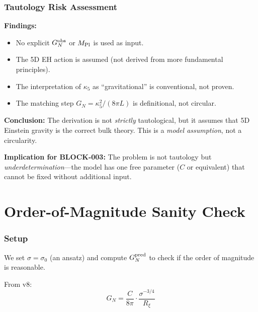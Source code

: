 \documentclass[11pt,a4paper]{article}
\begin{document}
\section{Tautology Risk Assessment}

\begin{resultbox}
\textbf{Findings:}
\begin{itemize}
\item No explicit $G_N^{\rm obs}$ or $M_{\rm Pl}$ is used as input.
\item The 5D EH action is assumed (not derived from more fundamental principles).
\item The interpretation of $\kappa_5$ as ``gravitational'' is conventional,
not proven.
\item The matching step $G_N = \kappa_5^2/(8\pi L)$ is definitional, not
circular.
\end{itemize}

\textbf{Conclusion:} The derivation is not \textit{strictly} tautological,
but it assumes that 5D Einstein gravity is the correct bulk theory. This
is a \textit{model assumption}, not a circularity.

\textbf{Implication for BLOCK-003:} The problem is not tautology but
\textit{underdetermination}---the model has one free parameter ($C$ or
equivalent) that cannot be fixed without additional input.
\end{resultbox}

\newpage
\part{Order-of-Magnitude Sanity Check}

\section{Setup}

We set $\sigma = \sigma_0$ (an ansatz) and compute $G_N^{\rm pred}$ to check
if the order of magnitude is reasonable.

From v8:
\begin{equation}
G_N = \frac{C}{8\pi} \cdot \frac{\sigma^{-3/4}}{R_\xi}
\label{eq:gn_formula}
\end{equation}
\end{document}
